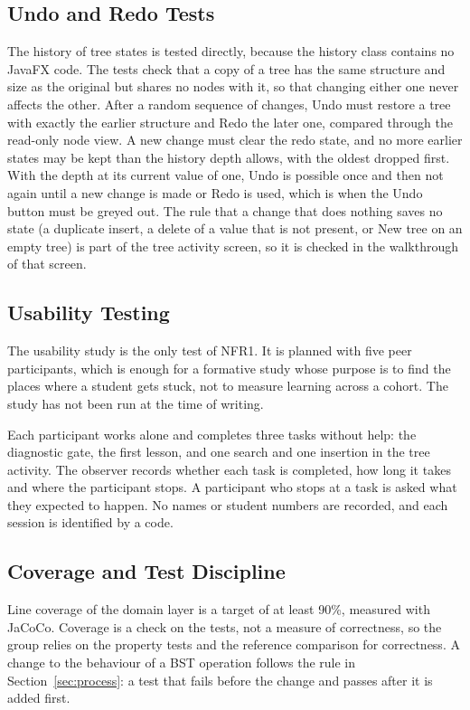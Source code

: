 \subsection{Undo and Redo Tests}
The history of tree states is tested directly, because the history class contains no JavaFX code. The tests check that a copy of a tree has the same structure and size as the original but shares no nodes with it, so that changing either one never affects the other. After a random sequence of changes, Undo must restore a tree with exactly the earlier structure and Redo the later one, compared through the read-only node view. A new change must clear the redo state, and no more earlier states may be kept than the history depth allows, with the oldest dropped first. With the depth at its current value of one, Undo is possible once and then not again until a new change is made or Redo is used, which is when the Undo button must be greyed out. The rule that a change that does nothing saves no state (a duplicate insert, a delete of a value that is not present, or New tree on an empty tree) is part of the tree activity screen, so it is checked in the walkthrough of that screen.

\subsection{Usability Testing}
The usability study is the only test of NFR1. It is planned with five peer participants, which is enough for a formative study whose purpose is to find the places where a student gets stuck, not to measure learning across a cohort. The study has not been run at the time of writing.

Each participant works alone and completes three tasks without help: the diagnostic gate, the first lesson, and one search and one insertion in the tree activity. The observer records whether each task is completed, how long it takes and where the participant stops. A participant who stops at a task is asked what they expected to happen. No names or student numbers are recorded, and each session is identified by a code.

\subsection{Coverage and Test Discipline}
Line coverage of the domain layer is a target of at least 90\%, measured with JaCoCo. Coverage is a check on the tests, not a measure of correctness, so the group relies on the property tests and the reference comparison for correctness. A change to the behaviour of a BST operation follows the rule in Section~\ref{sec:process}: a test that fails before the change and passes after it is added first.